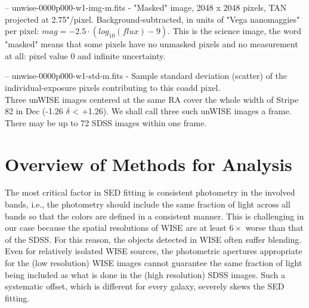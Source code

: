 \documentclass[numberedappendix,apj,twocolumn]{emulateapj}
\begin{document}
-- unwise-0000p000-w1-img-m.fits - "Masked" image, 2048 x 2048 pixels, TAN projected at 2.75"/pixel. Background-subtracted, in units of "Vega nanomaggies" per pixel: $mag = -2.5 \cdot (log_{10}(flux) - 9)$. This is the science image, the word "masked" means that some pixels have no unmasked pixels and no measurement at all: pixel value 0 and infinite uncertainty.

-- unwise-0000p000-w1-std-m.fits - Sample standard deviation (scatter) of the individual-exposure pixels  contributing to this coadd pixel.\\

Three unWISE images centered at the same RA cover the whole width of Stripe 82 in Dec (-1.26 $\delta$ < +1.26). We shall call three such unWISE images a frame. There may be up to 72 SDSS images within one frame.

\section{Overview of Methods for Analysis}


The most critical factor in SED fitting is consistent photometry in the involved bands, i.e., the photometry should include the same fraction of light across all bands so that the colors are defined in a consistent manner. This is challenging in our case because the spatial resolutions of WISE are at least $6\times$ worse than that of the SDSS. For this reason, the objects detected in WISE often suffer blending. Even for relatively isolated WISE sources, the photometric apertures appropriate for the (low resolution) WISE images cannot guarantee the same fraction of light being included as what is done in the (high resolution) SDSS images. Such a systematic offset, which is different for every galaxy, severely skews the SED fitting. 
\end{document}
